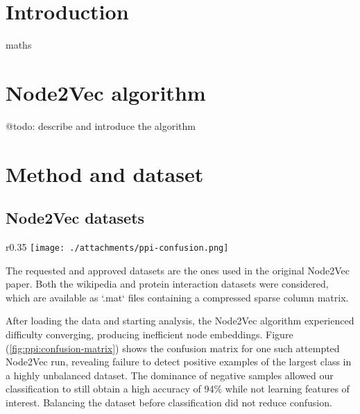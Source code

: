 \documentclass[a4paper,10pt]{article}
\begin{document}



\tableofcontents
\newpage

\section{Introduction}
\gls{maths}

\section{Node2Vec algorithm}

@todo: describe and introduce the algorithm

\section{Method and dataset}

\subsection{Node2Vec datasets}

\begin{wrapfigure}{r}{0.35\textwidth}
  \centering
  \vspace{-8mm}
      \texttt{[image: ./attachments/ppi-confusion.png]}
        \caption{Confusion matrix for PPI dataset}
        \label{fig:ppi:confusion-matrix}
\end{wrapfigure}

The requested and approved datasets are the ones used in the original Node2Vec paper. Both the wikipedia and protein interaction datasets were considered, which are available as `.mat` files containing a compressed sparse column matrix.

After loading the data and starting analysis, the Node2Vec algorithm experienced difficulty converging, producing inefficient node embeddings. Figure (\ref{fig:ppi:confusion-matrix}) shows the confusion matrix for one such attempted Node2Vec run, revealing failure to detect positive examples of the largest class in a highly unbalanced dataset. The dominance of negative samples allowed our classification to still obtain a high accuracy of 94\% while not learning features of interest. Balancing the dataset before classification did not reduce confusion.
\end{document}
